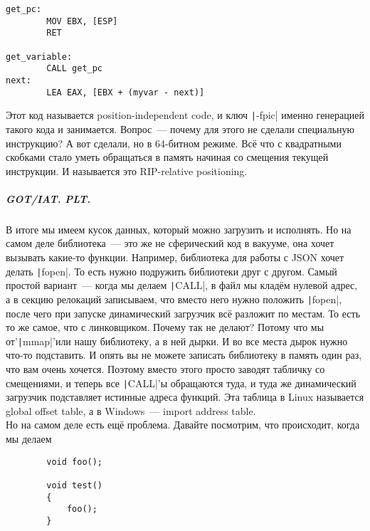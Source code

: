 \documentclass{article}
\begin{document}
    \begin{verbatim}
get_pc:
        MOV EBX, [ESP]
        RET

get_variable:
        CALL get_pc
next:
        LEA EAX, [EBX + (myvar - next)]
    \end{verbatim}
    Этот код называется position-independent code, и ключ \texttt|-fpic| именно генерацией такого кода и занимается. Вопрос~--- почему для этого не сделали специальную инструкцию? А вот сделали, но в 64-битном режиме. Всё что с квадратными скобками стало уметь обращаться в память начиная со смещения текущей инструкции. И называется это RIP-relative positioning.
    \subparagraph{GOT/IAT. PLT.}
    В итоге мы имеем кусок данных, который можно загрузить и исполнять. Но на самом деле библиотека~--- это же не сферический код в вакууме, она хочет вызывать какие-то функции. Например, библиотека для работы с JSON хочет делать \texttt|fopen|. То есть нужно подружить библиотеки друг с другом. Самый простой вариант~--- когда мы делаем \texttt|CALL|, в файл мы кладём нулевой адрес, а в секцию релокаций записываем, что вместо него нужно положить \texttt|fopen|, после чего при запуске динамический загрузчик всё разложит по местам. То есть то же самое, что с линковщиком. Почему так не делают? Потому что мы от'\texttt|mmap|'или нашу библиотеку, а в ней дырки. И во все места дырок нужно что-то подставить. И опять вы не можете записать библиотеку в память один раз, что вам очень хочется. Поэтому вместо этого просто заводят табличку со смещениями, и теперь все \texttt|CALL|'ы обращаются туда, и туда же динамический загрузчик подставляет истинные адреса функций. Эта таблица в Linux называется global offset table, а в Windows~--- import address table.\\
    Но на самом деле есть ещё проблема. Давайте посмотрим, что происходит, когда мы делаем
    \begin{verbatim}
        void foo();

        void test()
        {
            foo();
        }
    \end{verbatim}
\end{document}
